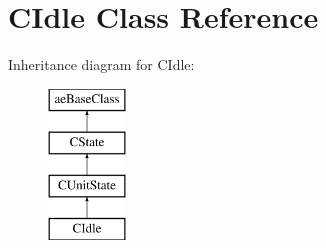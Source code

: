 \hypertarget{class_c_idle}{}\section{C\+Idle Class Reference}
\label{class_c_idle}
Inheritance diagram for C\+Idle\+:\begin{figure}[H]
\begin{center}
\leavevmode
\includegraphics[height=4.000000cm]{class_c_idle}
\end{center}
\end{figure}
